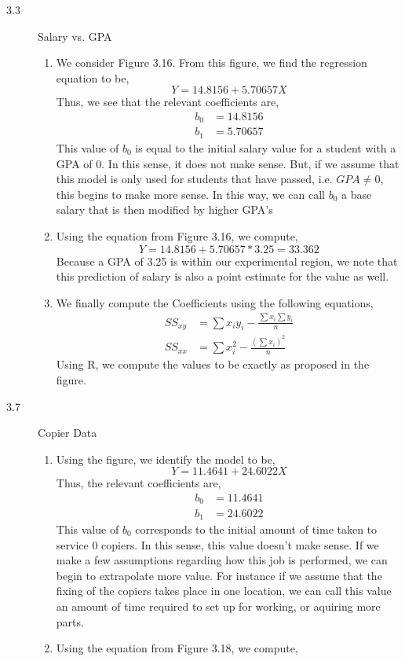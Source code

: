 \documentclass[letterpaper,10pt]{article}
\begin{document}
\begin{description}
\item[3.3] Salary vs. GPA
\begin{enumerate}[label=\alph*.]
\item We consider Figure 3.16. From this figure, we find the regression equation to be,
\[Y=14.8156+5.70657X\]
Thus, we see that the relevant coefficients are,
\begin{align*}
b_0 &=14.8156\\
b_1 &=5.70657
\end{align*}
This value of $b_0$ is equal to the initial salary value for a student with a GPA of $0$. In this sense, it does not make sense. But, if we assume that this model is only used for students that have passed, i.e. $GPA\neq0$, this begins to make more sense. In this way, we can call $b_0$ a base salary that is then modified by higher GPA's
\item Using the equation from Figure 3.16, we compute,
\[Y=14.8156+5.70657*3.25=33.362\]
Because a GPA of 3.25 is within our experimental region, we note that this prediction of salary is also a point estimate for the  value as well.
\item We finally compute the Coefficients using the following equations,
\begin{align*}
SS_{xy}&=\sum x_iy_i-\frac{\sum x_i\sum y_i}{n}\\
SS_{xx}&=\sum x_i^2-\frac{(\sum x_i)^2}{n}
\end{align*}
Using R, we compute the values to be exactly as proposed in the figure.
\end{enumerate}
\item[3.7] Copier Data
\begin{enumerate}[label=\alph*.]
\item Using the figure, we identify the model to be,
\[Y=11.4641+24.6022X\]
Thus, the relevant coefficients are,
\begin{align*}
b_0&=11.4641\\
b_1&=24.6022
\end{align*}
This value of $b_0$ corresponds to the initial amount of time taken to service $0$ copiers. In this sense, this value doesn't make sense. If we make a few assumptions regarding how this job is performed, we can begin to extrapolate more value. For instance if we assume that the fixing of the copiers takes place in one location, we can call this value an amount of time required to set up for working, or aquiring more parts.
\item Using the equation from Figure 3.18, we compute,

\end{enumerate}
\end{description}
\end{document}
